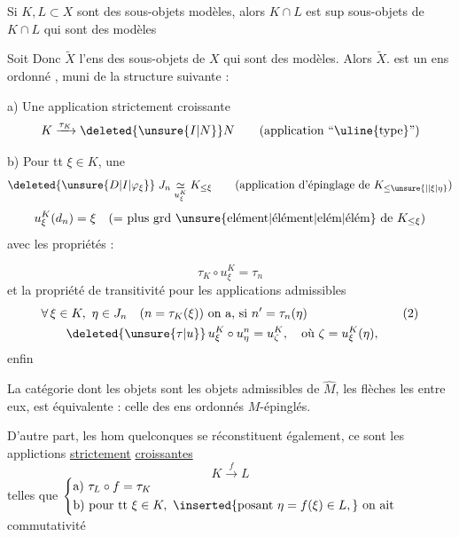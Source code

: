 Si $K,L\subset X$ sont des sous-objets modèles, alors $K\cap L$ est sup  sous-objets de $K\cap L$ qui sont des modèles

Soit Donc $\widetilde X$ l'ens des  sous-objets de $X$ qui sont des modèles. Alors $\widetilde X$. est un ens ordonné , muni de la structure suivante  : 

a)  Une application strictement croissante
\[
K\xrightarrow{\tau_K}\deleted{\unsure{I|N}}N
\qquad\text{(application ``\uline{type}'')}
\]

b) Pour tt $\xi\in K$,  une  
\[
\deleted{\unsure{D|I|\varphi_\xi}}\;J_n\underset{u_\xi^K}{\simeq}K_{\leq\xi}
\qquad\text{(application d'épinglage de }K_{\leq\unsure{\mid|\xi|\eta}}\text{)}
\]
\[
u_\xi^K(d_n)=\xi\quad\text{(= plus grd \unsure{elément|élément|elém|élém} de }K_{\leq\xi}\text{)}
\]
avec  les propriétés  :

\begingroup\makeatletter\tagsleft@true\makeatother
\[
\tau_K\circ u_\xi^K=\tau_n\tag*{(1)}
\]
et la propriété de transitivité pour les applications admissibles
\[
\begin{aligned}[t]
&\forall\,\xi\in K,\ \eta\in J_n\quad(n=\tau_K(\xi))\ \text{on a, si }n'=\tau_n(\eta)\\
&\qquad\deleted{\unsure{\tau|u}}\,u_\xi^K\circ u_\eta^n=u_\zeta^K,\quad\text{où }\zeta=u_\xi^K(\eta),
\end{aligned}\tag*{(2)}
\]
\endgroup
enfin


La catégorie dont les objets sont les objets admissibles de $\widehat M$, les flèches les  entre eux, est équivalente : celle des ens ordonnés $M$-épinglés.

D'autre part, les hom quelconques  se réconstituent également, ce sont les applictions \uline{strictement} \uline{croissantes}
\[
K\xrightarrow{f}L
\]
telles que $\left\{\begin{aligned}
&\text{a) }\tau_L\circ f=\tau_K\\
&\text{b) pour tt }\xi\in K,\ \inserted{\text{posant }\eta=f(\xi)\in L,}\ \text{on ait}
\end{aligned}\right.$ commutativité 

